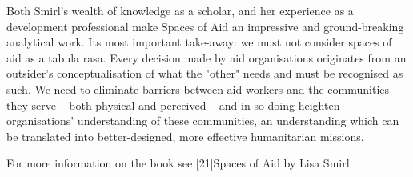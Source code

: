    Both Smirl's wealth of knowledge as a scholar, and her experience as a
   development professional make Spaces of Aid an impressive and
   ground-breaking analytical work. Its most important take-away: we must
   not consider spaces of aid as a tabula rasa. Every decision made by aid
   organisations originates from an outsider's conceptualisation of what
   the "other" needs and must be recognised as such. We need to eliminate
   barriers between aid workers and the communities they serve -- both
   physical and perceived -- and in so doing heighten organisations'
   understanding of these communities, an understanding which can be
   translated into better-designed, more effective humanitarian missions.


   For more information on the book see [21]Spaces of Aid by Lisa Smirl.

